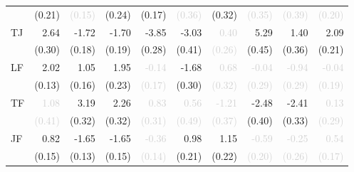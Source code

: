 \begin{tabular}{lrrrrrrrrr}
 &\tiny{(0.21)} &\textcolor{LightGray}{\tiny{(0.15)}} &\tiny{(0.24)} &\tiny{(0.17)} &\cellcolor{Gray}\textcolor{LightGray}{\tiny{(0.36)}} &\tiny{(0.32)} &\textcolor{LightGray}{\tiny{(0.35)}} &\textcolor{LightGray}{\tiny{(0.39)}} &\textcolor{LightGray}{\tiny{(0.20)}}\\[1ex]
\multirow{2}{*}{TJ} &2.64 &-1.72 &-1.70 &-3.85 &-3.03 &\cellcolor{Gray}\textcolor{LightGray}{0.40} &5.29 &1.40 &2.09\\
 &\tiny{(0.30)} &\tiny{(0.18)} &\tiny{(0.19)} &\tiny{(0.28)} &\tiny{(0.41)} &\cellcolor{Gray}\textcolor{LightGray}{\tiny{(0.26)}} &\tiny{(0.45)} &\tiny{(0.36)} &\tiny{(0.21)}\\[1ex]
\multirow{2}{*}{LF} &2.02 &1.05 &1.95 &\textcolor{LightGray}{-0.14} &-1.68 &\textcolor{LightGray}{0.68} &\cellcolor{Gray}\textcolor{LightGray}{-0.04} &\textcolor{LightGray}{-0.94} &\textcolor{LightGray}{-0.04}\\
 &\tiny{(0.13)} &\tiny{(0.16)} &\tiny{(0.23)} &\textcolor{LightGray}{\tiny{(0.17)}} &\tiny{(0.30)} &\textcolor{LightGray}{\tiny{(0.32)}} &\cellcolor{Gray}\textcolor{LightGray}{\tiny{(0.29)}} &\textcolor{LightGray}{\tiny{(0.29)}} &\textcolor{LightGray}{\tiny{(0.19)}}\\[1ex]
\multirow{2}{*}{TF} &\textcolor{LightGray}{1.08} &3.19 &2.26 &\textcolor{LightGray}{0.83} &\textcolor{LightGray}{0.56} &\textcolor{LightGray}{-1.21} &-2.48 &\cellcolor{Gray}-2.41 &\textcolor{LightGray}{0.13}\\
 &\textcolor{LightGray}{\tiny{(0.41)}} &\tiny{(0.32)} &\tiny{(0.32)} &\textcolor{LightGray}{\tiny{(0.31)}} &\textcolor{LightGray}{\tiny{(0.49)}} &\textcolor{LightGray}{\tiny{(0.37)}} &\tiny{(0.40)} &\cellcolor{Gray}\tiny{(0.33)} &\textcolor{LightGray}{\tiny{(0.29)}}\\[1ex]
\multirow{2}{*}{JF} &0.82 &-1.65 &-1.65 &\textcolor{LightGray}{-0.36} &0.98 &1.15 &\textcolor{LightGray}{-0.59} &\textcolor{LightGray}{-0.25} &\cellcolor{Gray}\textcolor{LightGray}{0.54}\\
 &\tiny{(0.15)} &\tiny{(0.13)} &\tiny{(0.15)} &\textcolor{LightGray}{\tiny{(0.14)}} &\tiny{(0.21)} &\tiny{(0.22)} &\textcolor{LightGray}{\tiny{(0.20)}} &\textcolor{LightGray}{\tiny{(0.26)}} &\cellcolor{Gray}\textcolor{LightGray}{\tiny{(0.17)}}\\[1ex]
\bottomrule
\end{tabular}
